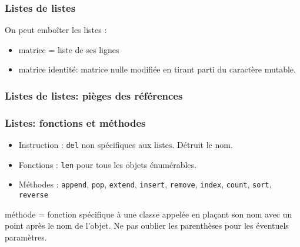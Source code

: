 \begin{frame}
  \frametitle{Listes de listes}
  On peut emboîter les listes :
  \begin{itemize}
    \item matrice = liste de ses lignes
    \item matrice identité: matrice nulle modifiée en tirant parti du caractère mutable.
  \end{itemize}
  
\end{frame}

\begin{frame}
  \frametitle{Listes de listes: pièges des références}
  
\end{frame}

\begin{frame}
  \frametitle{Listes: fonctions et méthodes}
  \begin{itemize}
    \item Instruction : \texttt{del} non spécifiques aux listes. Détruit le nom.
    \item Fonctions : \texttt{len} pour tous les objets énumérables.
    \item Méthodes : \texttt{append}, \texttt{pop},   \texttt{extend}, \texttt{insert}, \texttt{remove}, \texttt{index}, \texttt{count}, \texttt{sort}, \texttt{reverse}
  \end{itemize}
  méthode = fonction spécifique à une classe\newline
  appelée en plaçant son nom avec un point après le nom de l'objet. Ne pas oublier les parenthèses pour les éventuels paramètres.
\end{frame}


